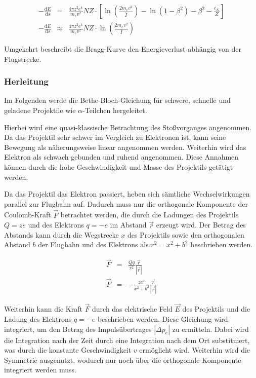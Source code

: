 \documentclass[12pt,a4paper]{scrartcl}
\numberwithin{equation}{section} %
\renewcommand{\[}{} %
\renewcommand{\]}{\noindent} %
\begin{document}
\[
\begin{eqnarray}
        -\frac{\mathrm dE}{\mathrm ds} &=&
                \frac{4\pi z^2 e^4}{m_e v^2} NZ \cdot
                \left[
                        \ln\left(\frac{2m_ev^2}{\bar I}\right)
                        - \ln\left(1 - \beta^2\right)
                        - \beta^2
                        - \frac{c_K}{Z}
                \right] \\
        -\frac{\mathrm dE}{\mathrm ds} &\approx&
                \frac{4\pi z^2 e^4}{m_e v^2} NZ \cdot
                \ln\left(\frac{2m_ev^2}{\bar I}\right)
\end{eqnarray}
\]

Umgekehrt beschreibt die Bragg-Kurve den Energieverlust abhängig von der
Flugstrecke.

\hypertarget{herleitung}{%
\subsubsection{Herleitung}\label{herleitung}}

Im Folgenden werde die Bethe-Bloch-Gleichung für schwere, schnelle und
geladene Projektile wie \(\alpha\)-Teilchen hergeleitet.

Hierbei wird eine quasi-klassische Betrachtung des Stoßvorganges
angenommen. Da das Projektil sehr schwer im Vergleich zu Elektronen ist,
kann seine Bewegung als näherungsweise linear angenommen werden.
Weiterhin wird das Elektron als schwach gebunden und ruhend angenommen.
Diese Annahmen können durch die hohe Geschwindigkeit und Masse des
Projektils getätigt werden.

Da das Projektil das Elektron passiert, heben sich sämtliche
Wechselwirkungen parallel zur Flugbahn auf. Dadurch muss nur die
orthogonale Komponente der Coulomb-Kraft \(\vec F\) betrachtet werden,
die durch die Ladungen des Projektils \(Q=ze\) und des Elektrons
\(q=-e\) im Abstand \(\vec r\) erzeugt wird. Der Betrag des Abstands
kann durch die Wegstrecke \(x\) des Projektils sowie den orthogonalen
Abstand \(b\) der Flugbahn und des Elektrons als \(r^2=x^2+b^2\)
beschrieben werden.

\[
\begin{eqnarray}
        \vec F &=& \frac{Qq}{r^2} \frac{\vec{r}}{\left|\vec r\right|} \\
        \vec F &=& -\frac{ze^2}{x^2+b^2} \frac{\vec{r}}{\left|\vec r\right|}
\end{eqnarray}
\]

Weiterhin kann die Kraft \(\vec F\) durch das elektrische Feld
\(\vec E\) des Projektils und die Ladung des Elektrons \(q=-e\)
beschrieben werden. Diese Gleichung wird integriert, um den Betrag des
Impulsübertrages \(\left|\Delta p_e\right|\) zu ermitteln. Dabei wird
die Integration nach der Zeit durch eine Integration nach dem Ort
substituiert, was durch die konstante Geschwindigkeit \(v\) ermöglicht
wird. Weiterhin wird die Symmetrie ausgenutzt, wodurch nur noch über die
orthogonale Komponente integriert werden muss.
\end{document}
